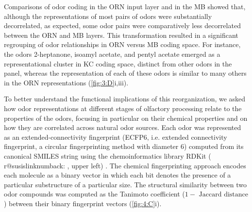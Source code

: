 \documentclass[12pt]{caltech_thesis}
\makeatletter
\renewcommand{\cite}{{ }\autocite}
\newenvironment{longcapfigure}{\begin{center}\def\my@captype{figure}}{\end{center}}
\providecommand\my@captype{\@captype}
\newcounter{susis}
\newcommand{\hypertargetd}[2]{%
  {\refstepcounter{susis}\label{susistarget#1}}%
  \ifcsname r@susislink#1\endcsname
  \hypertarget{#1}{#2}%
  \else
  \fbox{\textcolor{red}{#2}}%
  \fi
  }%
\newcommand{\hypertargetd}{\hypertarget}
\newcommand*\my@refwithbackref[2]{%
  \edef\my@brlabel{\my@br@parent{#2}}%
  \expandafter\my@br@explicitcall\expandafter{\my@brlabel}%
  \hypertargetd{numback:\my@brlabel}{#1{#2}}%
}
\newcommand*\crefwithbackref{\my@refwithbackref\my@origcref}
\makeatother
\begin{document}
\begin{refsection}
\begin{longcapfigure}

\end{longcapfigure}

Comparisons of odor coding in the ORN input layer and in the MB showed that, although the representations of most pairs of odors were substantially decorrelated, as expected, some odor pairs were comparatively less decorrelated between the ORN and MB layers.
This transformation resulted in a significant regrouping of odor relationships in ORN versus MB coding space.
For instance, the odors 2-heptanone, isoamyl acetate, and pentyl acetate emerged as a representational cluster in KC coding space, distinct from other odors in the panel, whereas the representation of each of these odors is similar to many others in the ORN representations (\cref{fig:3:D}i,iii).

To better understand the functional implications of this reorganization, we asked how odor representations at different stages of olfactory processing relate to the properties of the odors, focusing in particular on their chemical properties and on how they are correlated across natural odor sources.
Each odor was represented as an extended-connectivity fingerprint (ECFP6, i.e. extended connectivity fingerprint, a circular fingerprinting method with diameter 6) computed from its canonical SMILES string using the chemoinformatics library RDKit (\crefwithbackref{fig:4:B}, upper left)\cite{ECFP}.
The chemical fingerprinting approach encodes each molecule as a binary vector in which each bit denotes the presence of a particular substructure of a particular size.
The structural similarity between two odor compounds was computed as the Tanimoto coefficient ($1 -\text{ Jaccard distance}$) between their binary fingerprint vectors (\cref{fig:4:C}i).


\end{refsection}
\end{document}
